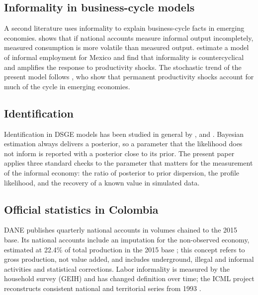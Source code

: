 \subsection{Informality in business-cycle models}

A second literature uses informality to explain business-cycle facts in emerging economies. \citet{RestrepoEchavarria2014} shows that if national accounts measure informal output incompletely, measured consumption is more volatile than measured output. \citet{FernandezMeza2015} estimate a model of informal employment for Mexico and find that informality is countercyclical and amplifies the response to productivity shocks. The stochastic trend of the present model follows \citet{AguiarGopinath2007}, who show that permanent productivity shocks account for much of the cycle in emerging economies.

\subsection{Identification}

Identification in DSGE models has been studied in general by \citet{CanovaSala2009}, \citet{Iskrev2010} and \citet{KoopPesaranSmith2013}. Bayesian estimation always delivers a posterior, so a parameter that the likelihood does not inform is reported with a posterior close to its prior. The present paper applies three standard checks to the parameter that matters for the measurement of the informal economy: the ratio of posterior to prior dispersion, the profile likelihood, and the recovery of a known value in simulated data.

\subsection{Official statistics in Colombia}

DANE publishes quarterly national accounts in volumes chained to the 2015 base. Its national accounts include an imputation for the non-observed economy, estimated at 22.4\% of total production in the 2015 base \citep{DANE_SIECI}; this concept refers to gross production, not value added, and includes underground, illegal and informal activities and statistical corrections. Labor informality is measured by the household survey (GEIH) and has changed definition over time; the ICML project reconstructs consistent national and territorial series from 1993 \citep{VeraJaramillo2025ICML}.
